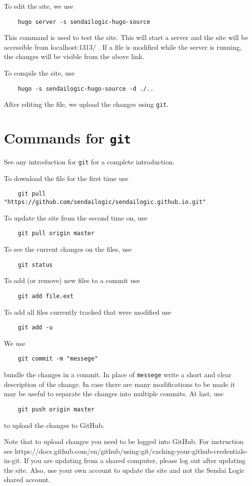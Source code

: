 \documentclass[a4paper]{article}
\begin{document}
To edit the site, we use
\begin{verbatim}
    hugo server -s sendailogic-hugo-source
\end{verbatim}
This command is used to test the site.
This will start a server and the site will be accessible from localhost:1313/ .
If a file is modified while the server is running, the changes will be visible from the above link.

To compile the site, use
\begin{verbatim}
    hugo -s sendailogic-hugo-source -d ./..
\end{verbatim}
After editing the file, we upload the changes using \texttt{git}.

\section{Commands for \texttt{git}}
See any introduction for \texttt{git} for a complete introduction.

To download the file for the first time use
\begin{verbatim}
    git pull "https://github.com/sendailogic/sendailogic.github.io.git"
\end{verbatim}
To update the site from the second time on, use
\begin{verbatim}
    git pull origin master
\end{verbatim}
To see the current changes on the files, use
\begin{verbatim}
    git status
\end{verbatim}
To add (or remove) new files to a commit use
\begin{verbatim}
    git add file.ext
\end{verbatim}
To add all files currently tracked that were modified use
\begin{verbatim}
    git add -u
\end{verbatim}
We use
\begin{verbatim}
    git commit -m "messege"
\end{verbatim}
bundle the changes in a commit.
In place of \texttt{messege} write a short and clear description of the change.
In case there are many modifications to be made it may be useful to separate the changes into multiple commits.
At last, use
\begin{verbatim}
    git push origin master
\end{verbatim}
to upload the changes to GitHub.

Note that to upload changes you need to be logged into GitHub.
For instruction see https://docs.github.com/en/github/using-git/caching-your-github-credentials-in-git.
If you are updating from a shared computer, please log out after updating the site.
Also, use your own account to update the site and not the Sendai Logic shared account.
\end{document}

